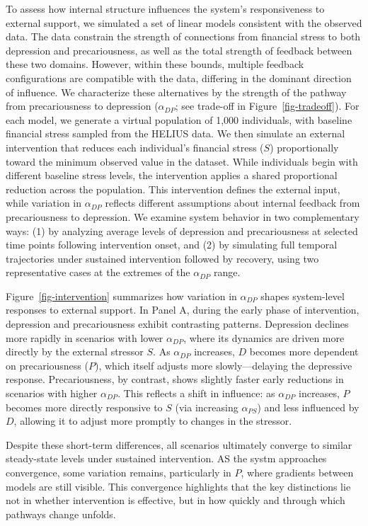 \documentclass[
]{article}
\begin{document}
To assess how internal structure influences the system's responsiveness
to external support, we simulated a set of linear models consistent with
the observed data. The data constrain the strength of connections from
financial stress to both depression and precariousness, as well as the
total strength of feedback between these two domains. However, within
these bounds, multiple feedback configurations are compatible with the
data, differing in the dominant direction of influence. We characterize
these alternatives by the strength of the pathway from precariousness to
depression (\(\alpha_{DP}\); see trade-off in
Figure~\ref{fig-tradeoff}). For each model, we generate a virtual
population of 1,000 individuals, with baseline financial stress sampled
from the HELIUS data. We then simulate an external intervention that
reduces each individual's financial stress (\(S\)) proportionally toward
the minimum observed value in the dataset. While individuals begin with
different baseline stress levels, the intervention applies a shared
proportional reduction across the population. This intervention defines
the external input, while variation in \(\alpha_{DP}\) reflects
different assumptions about internal feedback from precariousness to
depression. We examine system behavior in two complementary ways: (1) by
analyzing average levels of depression and precariousness at selected
time points following intervention onset, and (2) by simulating full
temporal trajectories under sustained intervention followed by recovery,
using two representative cases at the extremes of the \(\alpha_{DP}\)
range.

Figure~\ref{fig-intervention} summarizes how variation in
\(\alpha_{DP}\) shapes system-level responses to external support. In
Panel A, during the early phase of intervention, depression and
precariousness exhibit contrasting patterns. Depression declines more
rapidly in scenarios with lower \(\alpha_{DP}\), where its dynamics are
driven more directly by the external stressor \(S\). As \(\alpha_{DP}\)
increases, \(D\) becomes more dependent on precariousness (\(P\)), which
itself adjusts more slowly---delaying the depressive response.
Precariousness, by contrast, shows slightly faster early reductions in
scenarios with higher \(\alpha_{DP}\). This reflects a shift in
influence: as \(\alpha_{DP}\) increases, \(P\) becomes more directly
responsive to \(S\) (via increasing \(\alpha_{PS}\)) and less influenced
by \(D\), allowing it to adjust more promptly to changes in the
stressor.

Despite these short-term differences, all scenarios ultimately converge
to similar steady-state levels under sustained intervention. AS the
systm approaches convergence, some variation remains, particularly in
\(P\), where gradients between models are still visible. This
convergence highlights that the key distinctions lie not in whether
intervention is effective, but in how quickly and through which pathways
change unfolds.
\end{document}

